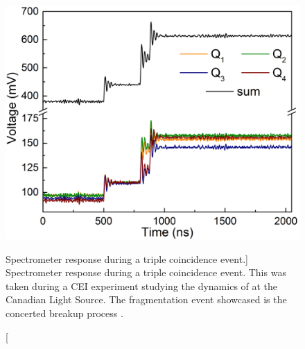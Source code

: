 \begin{figure}
  \centering
  \includegraphics[width=\textwidth]{gfx/TripleCoincidenceEvent}
  \caption
  [Spectrometer response during a triple coincidence event.]
  {Spectrometer response during a triple coincidence event. This was taken during a CEI experiment studying the dynamics of  at the Canadian Light Source. The fragmentation event showcased is the concerted breakup process .}
  \label{fig:tripleCoincidence}
\end{figure}

